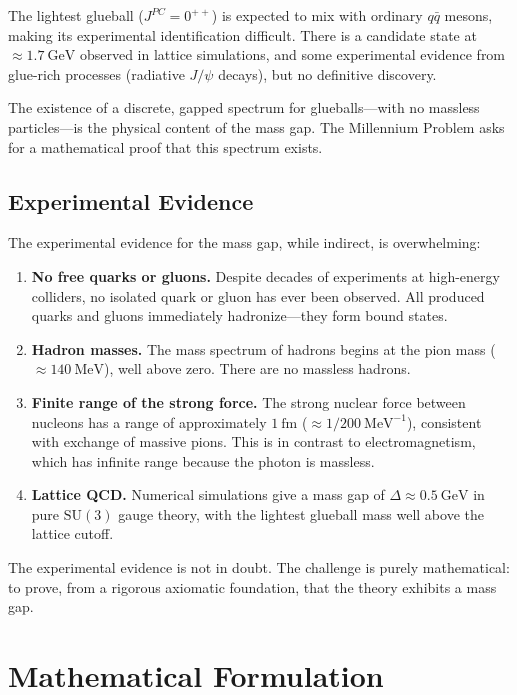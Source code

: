 The lightest glueball ($J^{PC} = 0^{++}$) is expected to mix with ordinary $q\bar{q}$ mesons, making its experimental identification difficult. There is a candidate state at $\approx 1.7~\mathrm{GeV}$ observed in lattice simulations, and some experimental evidence from glue-rich processes (radiative $J/\psi$ decays), but no definitive discovery.

The existence of a discrete, gapped spectrum for glueballs---with no massless particles---is the physical content of the mass gap. The Millennium Problem asks for a mathematical proof that this spectrum exists.

\subsection{Experimental Evidence}

The experimental evidence for the mass gap, while indirect, is overwhelming:

\begin{enumerate}
  \item \textbf{No free quarks or gluons.} Despite decades of experiments at high-energy colliders, no isolated quark or gluon has ever been observed. All produced quarks and gluons immediately hadronize---they form bound states.

  \item \textbf{Hadron masses.} The mass spectrum of hadrons begins at the pion mass ($\approx 140~\mathrm{MeV}$), well above zero. There are no massless hadrons.

  \item \textbf{Finite range of the strong force.} The strong nuclear force between nucleons has a range of approximately $1~\mathrm{fm}$ ($\approx 1/200~\mathrm{MeV}^{-1}$), consistent with exchange of massive pions. This is in contrast to electromagnetism, which has infinite range because the photon is massless.

  \item \textbf{Lattice QCD.} Numerical simulations give a mass gap of $\Delta \approx 0.5~\mathrm{GeV}$ in pure $\mathrm{SU}(3)$ gauge theory, with the lightest glueball mass well above the lattice cutoff.
\end{enumerate}

The experimental evidence is not in doubt. The challenge is purely mathematical: to prove, from a rigorous axiomatic foundation, that the theory exhibits a mass gap.

\section{Mathematical Formulation}

